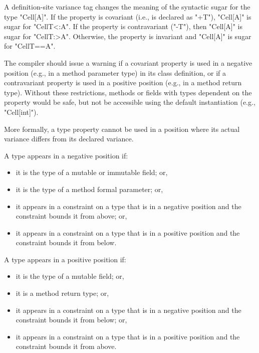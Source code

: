 \documentclass[nocopyrightspace,9pt]{sigplanconf}
\begin{document}
A definition-site variance tag changes the meaning of the
syntactic sugar for the type \xcd"Cell[A]".
If the property is covariant (i.e., is declared as \xcd"+T"), \xcd"Cell[A]"
is sugar for \xcd"Cell{T<:A}".
If the property is contravariant (\xcd"-T"), then \xcd"Cell[A]"
is sugar for \xcd"Cell{T:>A}".
Otherwise, the property is invariant and \xcd"Cell[A]"
is sugar for \xcd"Cell{T==A}".

The compiler should issue a warning if 
a covariant property is used in a negative position (e.g., in a
method parameter type)
in its class definition,
or if a contravariant property is used in a positive position
(e.g., in a method return type).
Without these restrictions, methods or fields with types
dependent on the property would be safe, but not be accessible 
using the default instantiation (e.g., \xcd"Cell[int]").

More formally, a type property cannot be used in a position
where its actual variance differs from its declared variance.




\infrule{
\vdash_{+}
}{}
\fi

%
A type appears in a negative position if:
\begin{itemize}
\item it is the type of a mutable or immutable field; or,
\item it is the type of a method formal parameter; or,
\item it appears in a constraint on a type that is in a negative position 
and the constraint bounds it from above; or,
\item it appears in a constraint on a type that is in a positive position 
and the constraint bounds it from below.
\end{itemize}
%
A type appears in a positive position if:
\begin{itemize}
\item it is the type of a mutable field; or,
\item it is a method return type; or,
\item it appears in a constraint on a type that is in a negative position 
and the constraint bounds it from below; or,
\item it appears in a constraint on a type that is in a positive position 
and the constraint bounds it from above.
\end{itemize}
\fi
\end{document}
